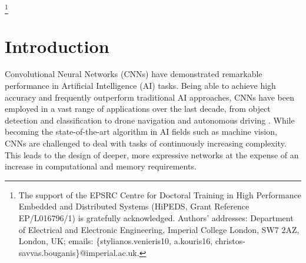 \documentclass[format=acmsmall, review=false, screen=true]{acmart}
\begin{document}

%
%




\thanks{The support of the EPSRC Centre for Doctoral Training in High Performance Embedded and Distributed Systems (HiPEDS, Grant Reference EP/L016796/1) is gratefully acknowledged.
Authors' addresses: Department of Electrical and Electronic Engineering, Imperial College London, SW7 2AZ, London, UK; emails: \{stylianos.venieris10, a.kouris16, christos-savvas.bouganis\}@imperial.ac.uk.
}


\maketitle

\renewcommand{\shortauthors}{S. I. Venieris, A. Kouris and C. S. Bouganis}



\section{Introduction}
\label{intro}

Convolutional Neural Networks (CNNs) \cite{Lecun1998} have demonstrated remarkable performance in \mbox{Artificial} Intelligence (AI) tasks. Being able to achieve high accuracy and frequently outperform traditional AI approaches, CNNs have been employed in a vast range of applications over the last decade, from object detection \cite{Ren_2017}\cite{Liu2016ssd} and classification \cite{Simonyan14c}\cite{Szegedy_2016} to drone navigation \cite{drone2017iros} and autonomous driving \cite{Chen2015deepdrive}\cite{Badrinarayanan_2017}. While becoming the state-of-the-art algorithm in AI fields such as machine vision, CNNs are challenged to deal with tasks of continuously increasing complexity. This leads to the design of deeper, more expressive networks at the expense of an increase in computational and memory requirements. 
\end{document}
